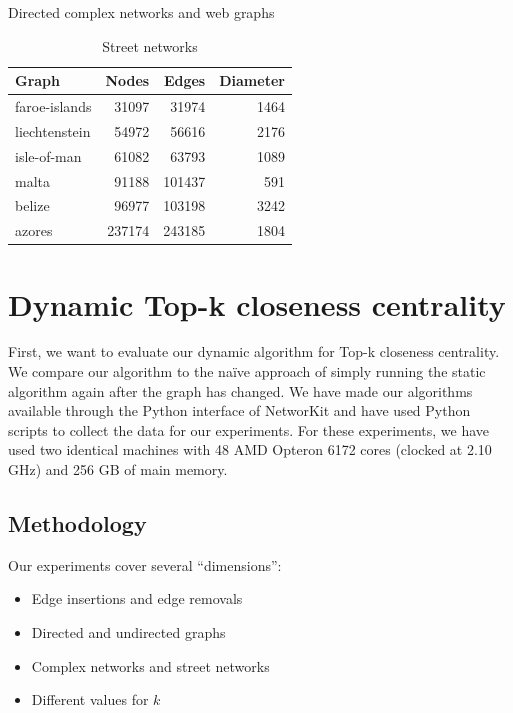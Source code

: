 \begin{table}[h!]
{\caption{Directed complex networks and web graphs}
}
\end{table}

\begin{table}[h!]
\centering
\begin{tabular}{lrrr}
\hline
 Graph         &   Nodes &   Edges &   Diameter \\
\hline
 faroe-islands &   31097 &   31974 &       1464 \\
 liechtenstein &   54972 &   56616 &       2176 \\
 isle-of-man   &   61082 &   63793 &       1089 \\
 malta         &   91188 &  101437 &        591 \\
 belize        &   96977 &  103198 &       3242 \\
 azores        &  237174 &  243185 &       1804 \\
\hline
\end{tabular}
\caption{Street networks}
\label{tbl:streetNetworks}

\end{table}


\FloatBarrier

\section{Dynamic Top-k closeness centrality}
First, we want to evaluate our dynamic algorithm for Top-k closeness centrality. We compare our algorithm to the na\"ive approach of simply running the static algorithm again after the graph has changed. We have made our algorithms available through the Python interface of NetworKit and have used Python scripts to collect the data for our experiments. For these experiments, we have used two identical machines with 48 AMD Opteron 6172 cores (clocked at 2.10 GHz) and 256 GB of main memory.

\subsection{Methodology}
Our experiments cover several ``dimensions'':

\begin{itemize}
	\item Edge insertions and edge removals
	\item Directed and undirected graphs
	\item Complex networks and street networks
	\item Different values for $k$
\end{itemize}


